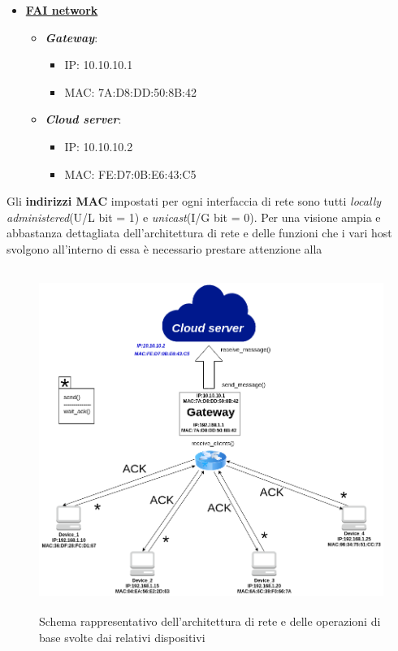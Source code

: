 \documentclass[a4paper,12pt]{report}
\begin{document}
\begin{itemize}
\begin{itemize}
\begin{itemize}
        \end{itemize}
    \end{itemize}
    \item \textbf{\underline{FAI network}}
    \begin{itemize}
        \item \emph{\textbf{Gateway}}: 
        \begin{itemize}
            \item IP: 10.10.10.1
            \item MAC: 7A:D8:DD:50:8B:42
        \end{itemize}
        \item \emph{\textbf{Cloud server}}: 
        \begin{itemize}
            \item IP: 10.10.10.2
            \item MAC: FE:D7:0B:E6:43:C5
        \end{itemize}
    \end{itemize}
\end{itemize}

Gli \textbf{indirizzi MAC} impostati per ogni interfaccia di rete sono tutti \emph{locally administered}(U/L bit = 1) e \emph{unicast}(I/G bit = 0).
%
Per una visione ampia e abbastanza dettagliata dell'architettura di rete e delle funzioni che i vari host svolgono all'interno di essa è necessario prestare attenzione alla 
\begin{figure}[H]
\centering{}
\includegraphics[width=\textwidth, height=30em]{img/HowHostsCommunicate.png}
\caption{Schema rappresentativo dell'architettura di rete e delle operazioni di base svolte dai relativi dispositivi}
\label{img:howhostscommunicate}
\end{figure}
%
\end{document}
